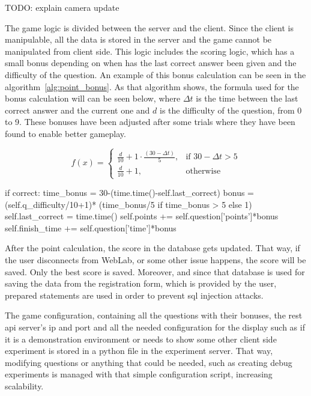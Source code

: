 TODO: explain camera update

The game logic is divided between the server and the client. Since the client is manipulable, all
the data is stored in the server and the game cannot be manipulated from client side. This logic
includes the scoring logic, which has a small bonus depending on when has the last correct answer
been given and the difficulty of the question. An example of this bonus calculation can be seen in
the algorithm~\ref{alg:point_bonus}. As that algorithm shows, the formula used for the bonus
calculation will can be seen below, where $\Delta{t}$ is the time between the last correct answer
and the current one and $d$ is the difficulty of the question, from 0 to 9. These bonuses have been
adjusted after some trials where they have been found to enable better gameplay.

\[
    f(x)=
\begin{cases}
    \frac{d}{10}+1\cdot\frac{(30-\Delta{t})}{5},	& \text{if } 30-\Delta{t} > 5\\
    \frac{d}{10}+1,									& \text{otherwise}
\end{cases}
\]

\begin{center}
\begin{minipage}{.9\textwidth}
\singlespace
{}
\begin{pyglist}[language=python, caption={Point bonus calculation.},
	label={alg:point_bonus}, listingname={Algorithm}, numbers=left]
if correct:
    time_bonus = 30-(time.time()-self.last_correct)
    bonus = (self.q_difficulty/10+1)*
        (time_bonus/5 if time_bonus > 5 else 1)
    self.last_correct = time.time()
    self.points += self.question['points']*bonus
    self.finish_time += self.question['time']*bonus
\end{pyglist}
\end{minipage}
\end{center}

After the point calculation, the score in the database gets updated. That way, if the user
disconnects from WebLab, or some other issue happens, the score will be saved. Only the best score
is saved. Moreover, and since that database is used for saving the data from the registration form,
which is provided by the user, prepared statements are used in order to prevent \acrshort{sql}
injection attacks.

The game configuration, containing all the questions with their bonuses, the \acrshort{rest}
\acrshort{api} server's \acrshort{ip} and port and all the needed configuration for the display such
as if it is a demonstration environment or needs to show some other client side experiment is stored
in a python file in the experiment server. That way, modifying questions or anything that could be
needed, such as creating debug experiments is managed with that simple configuration script,
increasing scalability.

